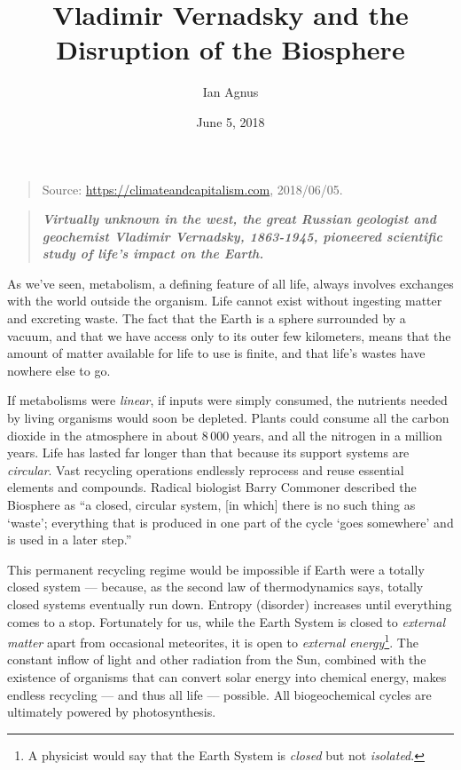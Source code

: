 \documentclass[11pt,a4paper]{article}
\title{Vladimir Vernadsky and the Disruption of the Biosphere}
\author{Ian Agnus}
\date{June 5, 2018}
\begin{document}
\maketitle
  \begin{quote}
  Source: \url{https://climateandcapitalism.com}, 2018/06/05.
  \end{quote}

  \begin{quote}\it\bf 
    Virtually unknown in the west, the great Russian geologist and geochemist
    Vladimir Vernadsky, 1863-1945, pioneered scientific study of life’s impact
    on the Earth.
  \end{quote}
As we’ve seen, metabolism, a defining feature of all life, always involves
exchanges with the world outside the organism. Life cannot exist without
ingesting matter and excreting waste. The fact that the Earth is a sphere
surrounded by a vacuum, and that we have access only to its outer few
kilometers, means that the amount of matter available for life to use is
finite, and that life’s wastes have nowhere else to go.

If metabolisms were \emph{linear}, if inputs were simply consumed, the
nutrients needed by living organisms would soon be depleted. Plants could
consume all the carbon dioxide in the atmosphere in about 8\,000 years, and
all the nitrogen in a million years. Life has lasted far longer than that
because its support systems are \emph{circular}. Vast recycling operations
endlessly reprocess and reuse essential elements and compounds. Radical
biologist Barry Commoner described the Biosphere as “a closed, circular
system, [in which] there is no such thing as ‘waste’; everything that is
produced in one part of the cycle ‘goes somewhere’ and is used in a later
step.” \cite[p. 10]{1}

This permanent recycling regime would be impossible if Earth were a totally
closed system — because, as the second law of thermodynamics says, totally
closed systems eventually run down. Entropy (disorder) increases until
everything comes to a stop. Fortunately for us, while the Earth System is
closed to \emph{external matter} apart from occasional meteorites, it is open
to \emph{external energy}\footnote{A physicist would say that the Earth System
  is \emph{closed} but not \emph{isolated}.}. The constant inflow of light and
other radiation from the Sun, combined with the existence of organisms that
can convert solar energy into chemical energy, makes endless recycling — and
thus all life — possible. All biogeochemical cycles are ultimately powered by
photosynthesis.
\end{document}
